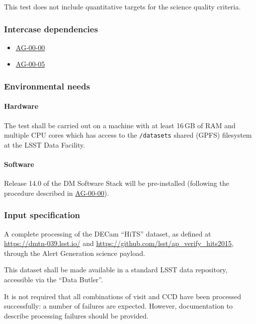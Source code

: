 This test does not include quantitative targets for the science quality
criteria.

\subsubsection{Intercase dependencies}

\begin{itemize}

  \item{\hyperref[ag-00-00]{AG-00-00}}
  \item{\hyperref[ag-00-05]{AG-00-05}}

\end{itemize}

\subsubsection{Environmental needs}

\paragraph{Hardware}

The test shall be carried out on a machine with at least 16\,GB of RAM and
multiple CPU cores which has access to the \texttt{/datasets} shared (GPFS)
filesystem at the LSST Data Facility.

\paragraph{Software}

Release 14.0 of the DM Software Stack will be pre-installed (following the
procedure described in \hyperref[ag-00-00]{AG-00-00}).

\subsubsection{Input specification}

A complete processing of the DECam ``HiTS'' dataset, as defined at
\url{https://dmtn-039.lsst.io/} and
\url{https://github.com/lsst/ap_verify_hits2015}, through the Alert
Generation science payload.

This dataset shall be made available in a standard LSST data repository,
accessible via the ``Data Butler''.

It is not required that all combinations of visit and CCD have been processed
successfully: a number of failures are expected. However, documentation to
describe processing failures should be provided.

